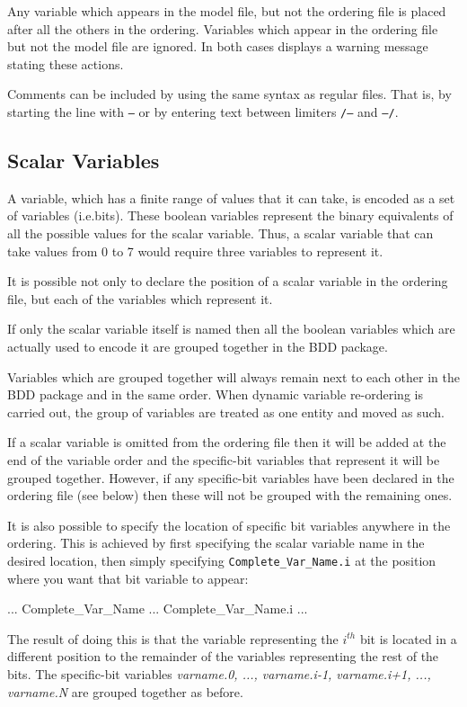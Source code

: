 \noindent Any variable which appears in the model file, but not the
ordering file is placed after all the others in the
ordering. Variables which appear in the ordering file but not the
model file are ignored. In both cases \nusmv displays a warning
message stating these actions.

Comments can be included by using the same syntax as regular \nusmv
files. That is, by starting the line with \texttt{--} or by entering
text between limiters \texttt{/--} and \texttt{--/}.

\subsection{Scalar Variables}
\label{Scalar Variables}
%
A variable, which has a finite range of values that it can take, is
encoded as a set of \Boolean variables (i.e.\@ bits). These boolean variables
represent the binary equivalents of all the possible values for the
scalar variable. Thus, a scalar variable that can take values from 0
to 7 would require three \Boolean variables to represent it.

It is possible not only to declare the position of a scalar variable
in the ordering file, but each of the \Boolean variables which
represent it.

\noindent If only the scalar variable itself is named then all the
boolean variables which are actually used to encode it are grouped
together in the BDD package.

\noindent Variables which are grouped together will always remain next
to each other in the BDD package and in the same order. 
%
When dynamic variable re-ordering is carried out, the group of
variables are treated as one entity and moved as such.

\noindent If a scalar variable is omitted from the ordering file then
it will be added at the end of the variable order and the specific-bit
variables that represent it will be grouped together. 
%
However, if any specific-bit variables have been declared in the
ordering file (see below) then these will not be grouped with the
remaining ones.

\noindent It is also possible to specify the location of specific bit variables
anywhere in the ordering.
%
This is achieved by first specifying the scalar variable name in the
desired location, then simply specifying
\texttt{Complete\_Var\_Name.i} at the position where you want that bit
variable to appear:
%
\begin{Grammar}
...
Complete\_Var\_Name
...
Complete\_Var\_Name.i
...
\end{Grammar}
%
The result of doing this is that the variable representing the
\textit{$i^{th}$} bit is located in a different position to the
remainder of the variables representing the rest of the bits. 
%
The specific-bit variables \textit{varname.0, ..., varname.i-1,
varname.i+1, ..., varname.N} are grouped together as before.

